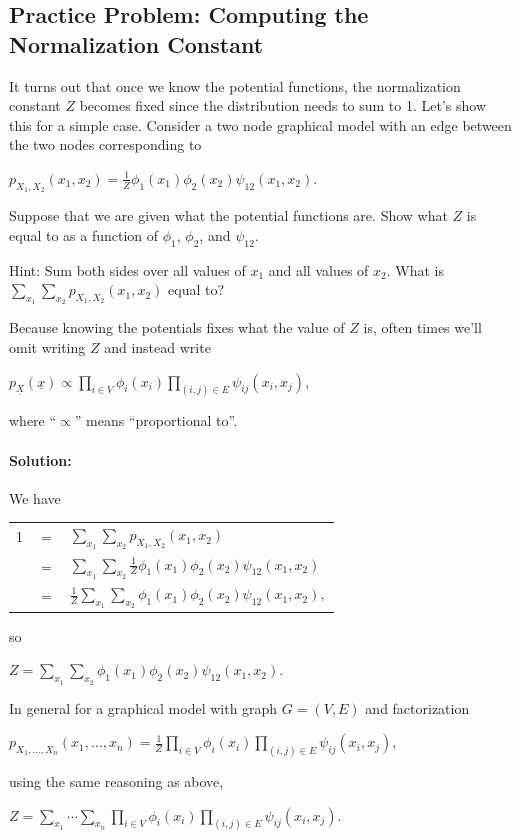 \documentclass[6008notes.tex]{subfiles}
\begin{document}
\subsection{Practice Problem: Computing the Normalization Constant }

It turns out that once we know the potential functions, the normalization constant $Z$ becomes fixed since the distribution needs to sum to 1. Let's show this for a simple case. Consider a two node graphical model with an edge between the two nodes corresponding to

{\centering$p_{X_{1},X_{2}}(x_{1},x_{2})=\frac{1}{Z}\phi _{1}(x_{1})\phi _{2}(x_{2})\psi _{12}(x_{1},x_{2}).$ \par}
 
Suppose that we are given what the potential functions are. Show what $Z$ is equal to as a function of $\phi_{1}$, $\phi_{2}$, and $\psi_{12}$.

Hint: Sum both sides over all values of $x_1$ and all values of $x_2$. What is $\sum _{x_{1}}\sum _{x_{2}}p_{X_{1},X_{2}}(x_{1},x_{2})$ equal to?

Because knowing the potentials fixes what the value of $Z$ is, often times we'll omit writing $Z$ and instead write

{\centering$p_{\underline{X}}(\underline{x})\propto \prod _{i\in V}\phi _{i}(x_{i})\prod _{(i,j)\in E}\psi _{ij}(x_{i},x_{j}),$ \par}
 
where ``$\propto$'' means ``proportional to''.

\paragraph{Solution:} We have

{\renewcommand{\arraystretch}{1.5}
\begin{tabular}{l l l}
1 & $=$ & $\sum _{x_{1}}\sum _{x_{2}}p_{X_{1},X_{2}}(x_{1},x_{2})$ \\
  & $=$ & $\sum _{x_{1}}\sum _{x_{2}}\frac{1}{Z}\phi _{1}(x_{1})\phi _{2}(x_{2})\psi _{12}(x_{1},x_{2})$ \\
  & $=$ & $\frac{1}{Z}\sum _{x_{1}}\sum _{x_{2}}\phi _{1}(x_{1})\phi _{2}(x_{2})\psi _{12}(x_{1},x_{2}),$ 
\end{tabular}}

so

{\centering$Z=\sum _{x_{1}}\sum _{x_{2}}\phi _{1}(x_{1})\phi _{2}(x_{2})\psi _{12}(x_{1},x_{2}).$ \par}
 
In general for a graphical model with graph $G=(V,E)$ and factorization

{\centering$p_{X_{1},\dots ,X_{n}}(x_{1},\dots ,x_{n})=\frac{1}{Z}\prod _{i\in V}\phi _{i}(x_{i})\prod _{(i,j)\in E}\psi _{ij}(x_{i},x_{j}),$ \par}
 
using the same reasoning as above,

{\centering$Z=\sum _{x_{1}}\cdots \sum _{x_{n}}\prod _{i\in V}\phi _{i}(x_{i})\prod _{(i,j)\in E}\psi _{ij}(x_{i},x_{j}).$ \par}
 
\end{document}
